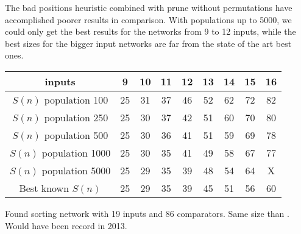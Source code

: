 \documentclass[../main.tex]{subfiles}
\begin{document}
	The bad positions heuristic combined with prune without permutations have accomplished poorer results in comparison. With populations up to 5000, we could only get the best results for the networks from 9 to 12 inputs, while the best sizes for the bigger input networks are far from the state of the art best ones.
	\begin{center}
		\begin{tabular}{|c | c c c c c c c c|} 
			\hline
			inputs & 9 & 10 & 11 & 12 & 13 & 14 & 15 & 16  \\ [0.5ex] 
			\hline\hline
			$S(n)$ population 100 & 25 & 31 & 37 & 46 & 52 & 62 & 72 & 82 \\ [1ex]
			\hline
			$S(n)$ population 250  & 25 & 30 & 37 & 42 & 51 & 60 & 70 & 80 \\  [1ex] 
			\hline
			$S(n)$ population 500 & 25 & 30 & 36 & 41 & 51 & 59 & 69 & 78 \\  [1ex] 
			\hline
			$S(n)$ population 1000 & 25 & 30 & 35 & 41 & 49 & 58 & 67 & 77 \\  [1ex] 
			\hline
			$S(n)$ population 5000 & 25 & 29 & 35 & 39 & 48 & 54 & 64 & X \\  [1ex] 
			\hline
			Best known $S(n)$ & 25 & 29 & 35 & 39 & 45 & 51 & 56 & 60 \\  [1ex] 
			\hline
		\end{tabular}
	\end{center}
	
	Found sorting network with 19 inputs and 86 comparators. Same size than \cite{valsalam:jmlr13}. Would have been record in 2013. 
	
	\newpage
\end{document}
